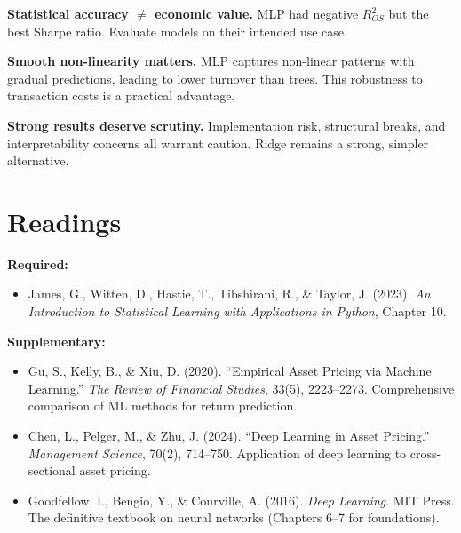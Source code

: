 \documentclass[11pt,a4paper]{article}
\begin{document}
\textbf{Statistical accuracy $\neq$ economic value.} MLP had negative $R^2_{OS}$ but the best Sharpe ratio. Evaluate models on their intended use case.

\textbf{Smooth non-linearity matters.} MLP captures non-linear patterns with gradual predictions, leading to lower turnover than trees. This robustness to transaction costs is a practical advantage.

\textbf{Strong results deserve scrutiny.} Implementation risk, structural breaks, and interpretability concerns all warrant caution. Ridge remains a strong, simpler alternative.

\section*{Readings}

\textbf{Required:}
\begin{itemize}
    \item James, G., Witten, D., Hastie, T., Tibshirani, R., \& Taylor, J. (2023). \textit{An Introduction to Statistical Learning with Applications in Python}, Chapter 10.
\end{itemize}

\textbf{Supplementary:}
\begin{itemize}
    \item Gu, S., Kelly, B., \& Xiu, D. (2020). ``Empirical Asset Pricing via Machine Learning.'' \textit{The Review of Financial Studies}, 33(5), 2223--2273. Comprehensive comparison of ML methods for return prediction.
    \item Chen, L., Pelger, M., \& Zhu, J. (2024). ``Deep Learning in Asset Pricing.'' \textit{Management Science}, 70(2), 714--750. Application of deep learning to cross-sectional asset pricing.
    \item Goodfellow, I., Bengio, Y., \& Courville, A. (2016). \textit{Deep Learning}. MIT Press. The definitive textbook on neural networks (Chapters 6--7 for foundations).
\end{itemize}

\end{document}

